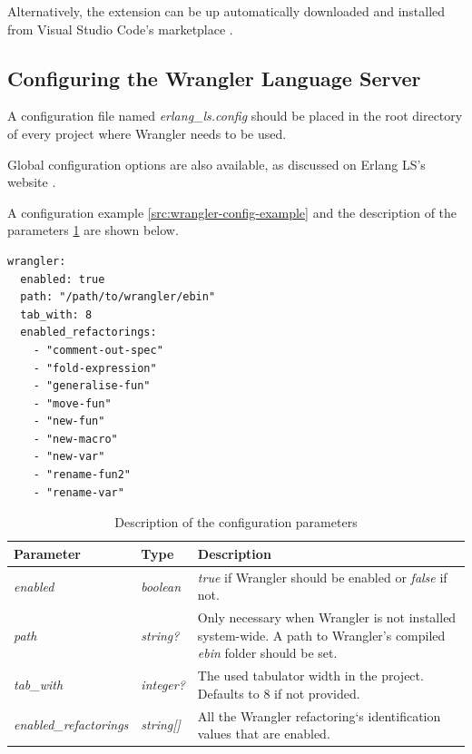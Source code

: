 Alternatively, the extension can be up automatically downloaded and installed from Visual Studio Code's marketplace \cite{ELSInstall}.

\subsection{Configuring the Wrangler Language Server}

A configuration file named \emph{erlang\_ls.config} should be placed in the root directory of every project where Wrangler needs to be used.
\begin{note}
Global configuration options are also available, as discussed on Erlang LS's website \cite{ELSConfig}.
\end{note}

A configuration example \ref{src:wrangler-config-example} and the description of the parameters \ref{tab:wrangler-config-descr} are shown below.

\begin{lstlisting}
wrangler:
  enabled: true
  path: "/path/to/wrangler/ebin" 
  tab_with: 8
  enabled_refactorings:
    - "comment-out-spec"
    - "fold-expression"
    - "generalise-fun"
    - "move-fun"
    - "new-fun"
    - "new-macro"
    - "new-var"
    - "rename-fun2"
    - "rename-var"
\end{lstlisting}


\begin{table}[H]
	\centering
	\begin{tabular}{ | m{} | m{} | m{} | }
		\hline
		\textbf{Parameter} & \textbf{Type} & \textbf{Description} \\
		\hline \hline
		\emph{enabled} & \emph{boolean} & \emph{true} if Wrangler should be enabled or \emph{false} if not. \\
		\hline
		\emph{path} & \emph{string?} & Only necessary when Wrangler is not installed system-wide. A path to Wrangler's compiled \emph{ebin} folder should be set. \\
		\hline
		\emph{tab\_with} & \emph{integer?} & The used tabulator width in the project. Defaults to 8 if not provided. \\
		\hline
		\emph{enabled\_refactorings} & \emph{string[]} & All the Wrangler refactoring`s identification values that are enabled.\\
		\hline
	\end{tabular}
	\caption{Description of the configuration parameters}
	\label{tab:wrangler-config-descr}
\end{table}

